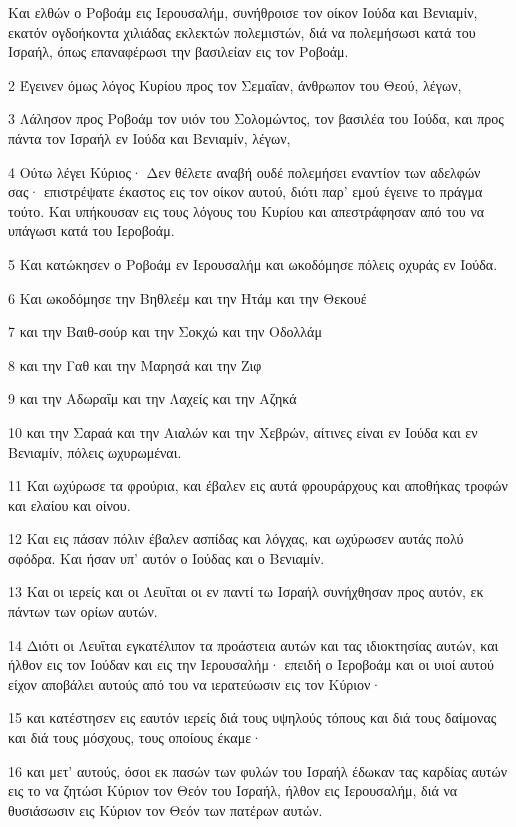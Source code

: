 \par Και ελθών ο Ροβοάμ εις Ιερουσαλήμ, συνήθροισε τον οίκον Ιούδα και Βενιαμίν, εκατόν ογδοήκοντα χιλιάδας εκλεκτών πολεμιστών, διά να πολεμήσωσι κατά του Ισραήλ, όπως επαναφέρωσι την βασιλείαν εις τον Ροβοάμ.
\par 2 Έγεινεν όμως λόγος Κυρίου προς τον Σεμαΐαν, άνθρωπον του Θεού, λέγων,
\par 3 Λάλησον προς Ροβοάμ τον υιόν του Σολομώντος, τον βασιλέα του Ιούδα, και προς πάντα τον Ισραήλ εν Ιούδα και Βενιαμίν, λέγων,
\par 4 Ούτω λέγει Κύριος· Δεν θέλετε αναβή ουδέ πολεμήσει εναντίον των αδελφών σας· επιστρέψατε έκαστος εις τον οίκον αυτού, διότι παρ' εμού έγεινε το πράγμα τούτο. Και υπήκουσαν εις τους λόγους του Κυρίου και απεστράφησαν από του να υπάγωσι κατά του Ιεροβοάμ.
\par 5 Και κατώκησεν ο Ροβοάμ εν Ιερουσαλήμ και ωκοδόμησε πόλεις οχυράς εν Ιούδα.
\par 6 Και ωκοδόμησε την Βηθλεέμ και την Ητάμ και την Θεκουέ
\par 7 και την Βαιθ-σούρ και την Σοκχώ και την Οδολλάμ
\par 8 και την Γαθ και την Μαρησά και την Ζιφ
\par 9 και την Αδωραΐμ και την Λαχείς και την Αζηκά
\par 10 και την Σαραά και την Αιαλών και την Χεβρών, αίτινες είναι εν Ιούδα και εν Βενιαμίν, πόλεις ωχυρωμέναι.
\par 11 Και ωχύρωσε τα φρούρια, και έβαλεν εις αυτά φρουράρχους και αποθήκας τροφών και ελαίου και οίνου.
\par 12 Και εις πάσαν πόλιν έβαλεν ασπίδας και λόγχας, και ωχύρωσεν αυτάς πολύ σφόδρα. Και ήσαν υπ' αυτόν ο Ιούδας και ο Βενιαμίν.
\par 13 Και οι ιερείς και οι Λευΐται οι εν παντί τω Ισραήλ συνήχθησαν προς αυτόν, εκ πάντων των ορίων αυτών.
\par 14 Διότι οι Λευΐται εγκατέλιπον τα προάστεια αυτών και τας ιδιοκτησίας αυτών, και ήλθον εις τον Ιούδαν και εις την Ιερουσαλήμ· επειδή ο Ιεροβοάμ και οι υιοί αυτού είχον αποβάλει αυτούς από του να ιερατεύωσιν εις τον Κύριον·
\par 15 και κατέστησεν εις εαυτόν ιερείς διά τους υψηλούς τόπους και διά τους δαίμονας και διά τους μόσχους, τους οποίους έκαμε·
\par 16 και μετ' αυτούς, όσοι εκ πασών των φυλών του Ισραήλ έδωκαν τας καρδίας αυτών εις το να ζητώσι Κύριον τον Θεόν του Ισραήλ, ήλθον εις Ιερουσαλήμ, διά να θυσιάσωσιν εις Κύριον τον Θεόν των πατέρων αυτών.
